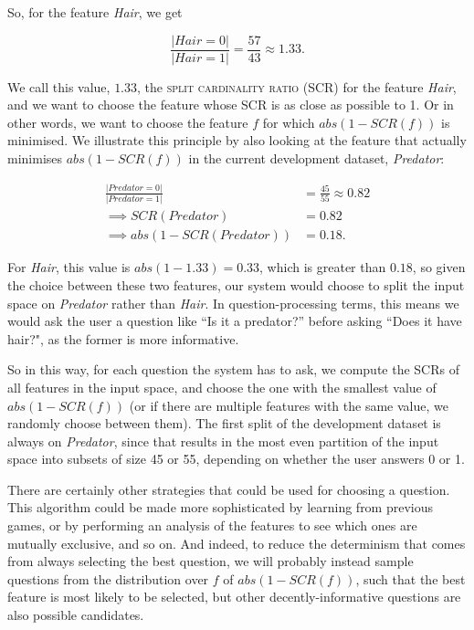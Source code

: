 \documentclass[11pt,a4paper]{article}
\begin{document}
So, for the feature \textit{Hair}, we get

$$\frac{|Hair = 0|}{|Hair = 1|} = \frac{57}{43} \approx 1.33.$$

We call this value, $1.33$, the \textsc{split cardinality ratio} (SCR) for the feature \textit{Hair}, and we want to choose the feature whose SCR is as close as possible to 1.
Or in other words, we want to choose the feature $f$ for which $abs(1 - SCR(f))$ is minimised.
We illustrate this principle by also looking at the feature that actually minimises  $abs(1 - SCR(f))$ in the current development dataset, \textit{Predator}:

\begin{align*}
	\frac{|Predator = 0|}{|Predator = 1|} &= \frac{45}{55} \approx 0.82 \\
	\implies SCR(Predator) & = 0.82\\
	\implies abs(1 - SCR(Predator)) &= 0.18.
\end{align*}

For \textit{Hair}, this value is $abs(1 - 1.33) = 0.33$, which is greater than $0.18$, so given the choice between these two features, our system would choose to split the input space on \textit{Predator} rather than \textit{Hair}.
In question-processing terms, this means we would ask the user a question like ``Is it a predator?'' before asking ``Does it have hair?", as the former is more informative.

So in this way, for each question the system has to ask, we compute the SCRs of all features in the input space, and choose the one with the smallest value of $abs(1 - SCR(f))$ (or if there are multiple features with the same value, we randomly choose between them).
The first split of the development dataset is always on \textit{Predator}, since that results in the most even partition of the input space into subsets of size 45 or 55, depending on whether the user answers 0 or 1.

There are certainly other strategies that could be used for choosing a question.
This algorithm could be made more sophisticated by learning from previous games, or by performing an analysis of the features to see which ones are mutually exclusive, and so on.
And indeed, to reduce the determinism that comes from always selecting the best question, we will probably instead sample questions from the distribution over $f$ of $abs(1 - SCR(f))$, such that the best feature is most likely to be selected, but other decently-informative questions are also possible candidates.
\end{document}
